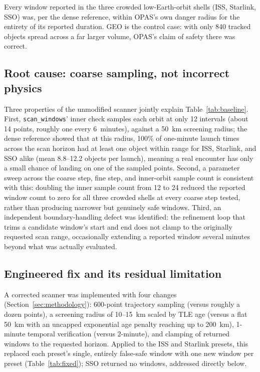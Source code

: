 \documentclass[11pt,a4paper]{article}
\begin{document}
Every window reported in the three crowded low-Earth-orbit shells (ISS,
Starlink, SSO) was, per the dense reference, within OPAS's own danger radius
for the entirety of its reported duration. GEO is the control case: with only
840 tracked objects spread across a far larger volume, OPAS's claim of safety
there was correct.

\subsection{Root cause: coarse sampling, not incorrect physics}

Three properties of the unmodified scanner jointly explain
Table~\ref{tab:baseline}. First, \texttt{scan\_windows}' inner check samples
each orbit at only 12 intervals (about 14 points, roughly one every
6~minutes), against a 50~km screening radius; the dense reference showed that
at this radius, 100\% of one-minute launch times across the scan horizon had
at least one object within range for ISS, Starlink, and SSO alike (mean
8.8--12.2 objects per launch), meaning a real encounter has only a small
chance of landing on one of the sampled points. Second, a parameter sweep
across the coarse step, fine step, and inner-orbit sample count is consistent
with this: doubling the inner sample count from 12 to 24 reduced the reported
window count to zero for all three crowded shells at every coarse step tested,
rather than producing narrower but genuinely safe windows. Third, an
independent boundary-handling defect was identified: the refinement loop that
trims a candidate window's start and end does not clamp to the originally
requested scan range, occasionally extending a reported window several
minutes beyond what was actually evaluated.

\subsection{Engineered fix and its residual limitation}

A corrected scanner was implemented with four changes
(Section~\ref{sec:methodology}): 600-point trajectory sampling (versus
roughly a dozen points), a screening radius of 10--15~km scaled by TLE age
(versus a flat 50~km with an uncapped exponential age penalty reaching up to
200~km), 1-minute temporal verification (versus 2-minute), and clamping of
returned windows to the requested horizon. Applied to the ISS and Starlink
presets, this replaced each preset's single, entirely false-safe window with
one new window per preset (Table~\ref{tab:fixed}); SSO returned no windows,
addressed directly below.
\end{document}
